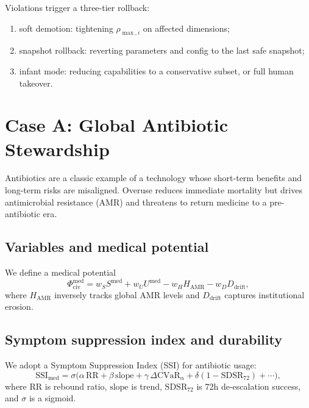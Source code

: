 \documentclass[11pt]{article}
\begin{document}
Violations trigger a three-tier rollback:
\begin{enumerate}[leftmargin=1.8em]
  \item soft demotion: tightening $\rho_{\max,i}$ on affected dimensions;
  \item snapshot rollback: reverting parameters and config to the last safe snapshot;
  \item infant mode: reducing capabilities to a conservative subset, or full human takeover.
\end{enumerate}

\section{Case A: Global Antibiotic Stewardship}
\label{sec:caseA}

Antibiotics are a classic example of a technology whose short-term benefits and long-term risks are misaligned. Overuse reduces immediate mortality but drives antimicrobial resistance (AMR) and threatens to return medicine to a pre-antibiotic era.

\subsection{Variables and medical potential}

We define a medical potential
\begin{equation}
\Phi_{\mathrm{civ}}^{\mathrm{med}}
= w_S S^{\mathrm{med}} + w_U U^{\mathrm{med}}
- w_H H_{\mathrm{AMR}} - w_D D_{\mathrm{drift}},
\end{equation}
where $H_{\mathrm{AMR}}$ inversely tracks global AMR levels and $D_{\mathrm{drift}}$ captures institutional erosion.

\subsection{Symptom suppression index and durability}

We adopt a Symptom Suppression Index (SSI) for antibiotic usage:
\begin{equation}
\mathrm{SSI}_{\mathrm{med}}
= \sigma\big(\alpha\,\mathrm{RR} + \beta\,\mathrm{slope}
+ \gamma\,\Delta\mathrm{CVaR}_\alpha + \delta(1-\mathrm{SDSR}_{72}) + \cdots\big),
\end{equation}
where $\mathrm{RR}$ is rebound ratio, $\mathrm{slope}$ is trend, $\mathrm{SDSR}_{72}$ is 72h de-escalation success, and $\sigma$ is a sigmoid.
\end{document}
